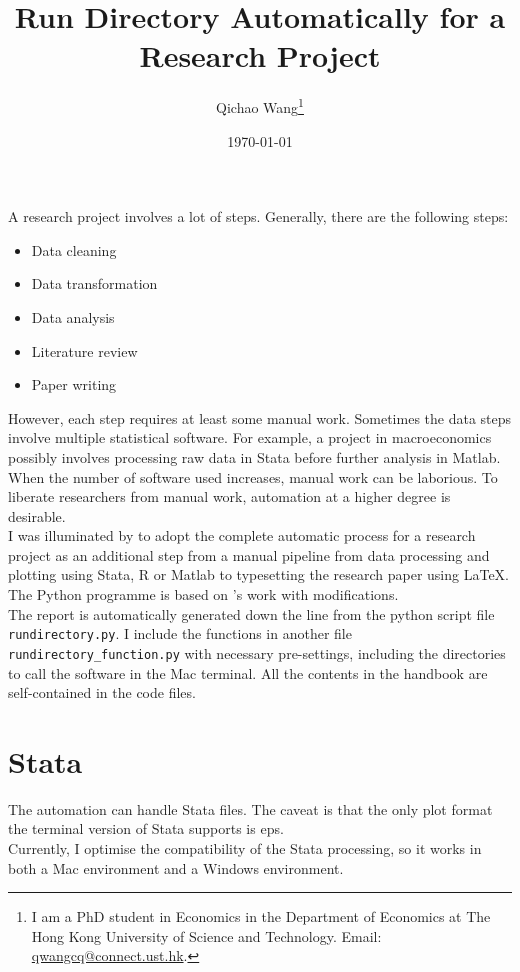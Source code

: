 \documentclass[12pt, a4paper]{article}
\title{Run Directory Automatically for a Research Project}
\author{Qichao Wang\thanks{I am a PhD student in Economics in the Department of Economics at The Hong Kong University of Science and Technology. Email: \href{mailto:qwangcq@connect.ust.hk}{qwangcq@connect.ust.hk}.}}
\date{\today}
\begin{document}
\maketitle

A research project involves a lot of steps. Generally, there are the following steps:
\begin{itemize}
	\item Data cleaning
	\item Data transformation
	\item Data analysis
	\item Literature review
	\item Paper writing
\end{itemize}
However, each step requires at least some manual work. Sometimes the data steps involve multiple statistical software. For example, a project in macroeconomics possibly involves processing raw data in Stata before further analysis in Matlab. When the number of software used increases, manual work can be laborious. To liberate researchers from manual work, automation at a higher degree is desirable.\\

I was illuminated by \textcite{gentzkow_code_2014} to adopt the complete automatic process for a research project as an additional step from a manual pipeline from data processing and plotting using Stata, R or Matlab to typesetting the research paper using \LaTeX. The Python programme is based on \textcite{hofman_github_2018}'s work with modifications.\\

The report is automatically generated down the line from the python script file \texttt{rundirectory.py}. I include the functions in another file \texttt{rundirectory\_function.py} with necessary pre-settings, including the directories to call the software in the Mac terminal. All the contents in the handbook are self-contained in the code files.\\

\section{Stata}

The automation can handle Stata files. The caveat is that the only plot format the terminal version of Stata supports is eps.\\

Currently, I optimise the compatibility of the Stata processing, so it works in both a Mac environment and a Windows environment.\\
\end{document}
